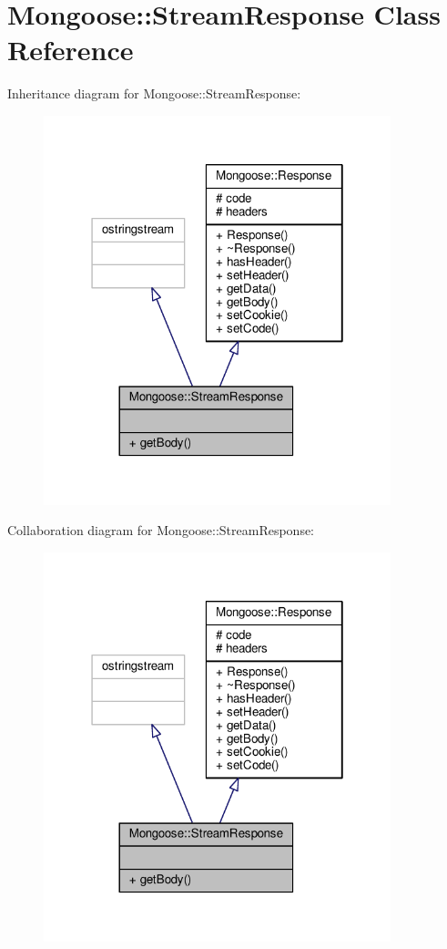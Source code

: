 \hypertarget{classMongoose_1_1StreamResponse}{}\section{Mongoose\+:\+:Stream\+Response Class Reference}
\label{classMongoose_1_1StreamResponse}


Inheritance diagram for Mongoose\+:\+:Stream\+Response\+:
\nopagebreak
\begin{figure}[H]
\begin{center}
\leavevmode
\includegraphics[width=286pt]{da/da8/classMongoose_1_1StreamResponse__inherit__graph}
\end{center}
\end{figure}


Collaboration diagram for Mongoose\+:\+:Stream\+Response\+:
\nopagebreak
\begin{figure}[H]
\begin{center}
\leavevmode
\includegraphics[width=286pt]{d7/d25/classMongoose_1_1StreamResponse__coll__graph}
\end{center}
\end{figure}
